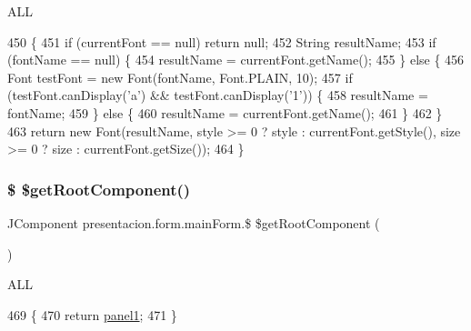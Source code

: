A\+LL 
\begin{DoxyCode}
450                                                                                        \{
451         \textcolor{keywordflow}{if} (currentFont == null) \textcolor{keywordflow}{return} null;
452         String resultName;
453         \textcolor{keywordflow}{if} (fontName == null) \{
454             resultName = currentFont.getName();
455         \} \textcolor{keywordflow}{else} \{
456             Font testFont = \textcolor{keyword}{new} Font(fontName, Font.PLAIN, 10);
457             \textcolor{keywordflow}{if} (testFont.canDisplay(\textcolor{charliteral}{'a'}) && testFont.canDisplay(\textcolor{charliteral}{'1'})) \{
458                 resultName = fontName;
459             \} \textcolor{keywordflow}{else} \{
460                 resultName = currentFont.getName();
461             \}
462         \}
463         \textcolor{keywordflow}{return} \textcolor{keyword}{new} Font(resultName, style >= 0 ? style : currentFont.getStyle(), size >= 0 ? size : 
      currentFont.getSize());
464     \}
\end{DoxyCode}
\mbox{\label{classpresentacion_1_1form_1_1mainForm_a7a42bc26bc20cc928c82bac33c43764c}} 
\subsubsection{\texorpdfstring{\$ \$get\+Root\+Component()}{$ $getRootComponent()}}
{\footnotesize\ttfamily J\+Component presentacion.\+form.\+main\+Form.\$ \$get\+Root\+Component (\begin{DoxyParamCaption}{ }\end{DoxyParamCaption})\hspace{0.3cm}{\ttfamily [inline]}}

A\+LL 
\begin{DoxyCode}
469                                                \{
470         \textcolor{keywordflow}{return} \hyperlink{classpresentacion_1_1form_1_1mainForm_aa43e009cc6dc09d4e637385fbd361510}{panel1};
471     \}
\end{DoxyCode}
\mbox{\label{classpresentacion_1_1form_1_1mainForm_aed3c3dcfaece65c649c095e292eca671}} 
